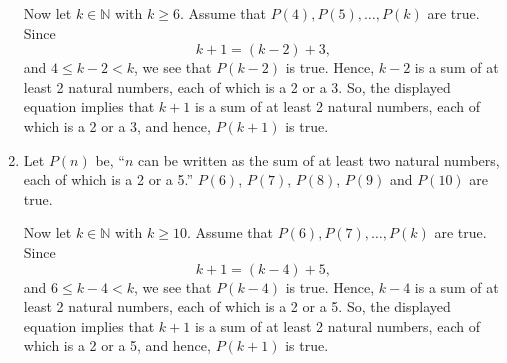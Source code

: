 \begin{enumerate}
Now let $k \in \mathbb{N}$ with $k \geq 6$.  Assume that $P \left( 4 \right), P \left( 5 \right), \ldots, P \left( k \right)$ are true.  Since
\[
k + 1 = \left( k - 2 \right) + 3,
\]
and $4 \leq k - 2 < k$, we see that $P \left( k - 2 \right)$ is true.  Hence, $ k - 2$ is a sum of at least 2 natural numbers, each of which is a 2 or a 3.  So, the displayed equation implies that $k + 1$ is a sum of at least 2 natural numbers, each of which is a 2 or a 3, and hence, 
$P \left( k + 1 \right)$ is true.



\item Let $P \left( n \right)$ be, ``$n$ can be written as the sum of at least two natural numbers, each of which is a 2 or a 5.''  $P \left( 6 \right)$, $P \left( 7 \right)$, 
$P \left( 8 \right)$, $P \left( 9 \right)$ and $P \left( 10 \right)$ are true.

Now let $k \in \mathbb{N}$ with $k \geq 10$.  Assume that $P \left( 6 \right), P \left( 7 \right), \ldots, P \left( k \right)$ are true.  Since
\[
k + 1 = \left( k - 4 \right) + 5,
\]
and $6 \leq k - 4 < k$, we see that $P \left( k - 4 \right)$ is true.  Hence, $ k - 4$ is a sum of at least 2 natural numbers, each of which is a 2 or a 5.  So, the displayed equation implies that $k + 1$ is a sum of at least 2 natural numbers, each of which is a 2 or a 5, and hence, 
$P \left( k + 1 \right)$ is true.

%







\end{enumerate}
